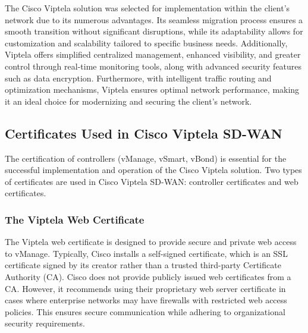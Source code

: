 \documentclass[12pt,english]{report}
\begin{document}
The Cisco Viptela solution was selected for implementation within the client’s network due to its numerous advantages. Its seamless migration process ensures a smooth transition without significant disruptions, while its adaptability allows for customization and scalability tailored to specific business needs. Additionally, Viptela offers simplified centralized management, enhanced visibility, and greater control through real-time monitoring tools, along with advanced security features such as data encryption. Furthermore, with intelligent traffic routing and optimization mechanisms, Viptela ensures optimal network performance, making it an ideal choice for modernizing and securing the client’s network.

\subsection{Certificates Used in Cisco Viptela SD-WAN}
The certification of controllers (vManage, vSmart, vBond) is essential for the successful implementation and operation of the Cisco Viptela solution. Two types of certificates are used in Cisco Viptela SD-WAN: controller certificates and web certificates\cite{ref16}.

\subsubsection{The Viptela Web Certificate}
The Viptela web certificate is designed to provide secure and private web access to vManage. Typically, Cisco installs a self-signed certificate, which is an SSL certificate signed by its creator rather than a trusted third-party Certificate Authority (CA). Cisco does not provide publicly issued web certificates from a CA. However, it recommends using their proprietary web server certificate in cases where enterprise networks may have firewalls with restricted web access policies. This ensures secure communication while adhering to organizational security requirements.
\end{document}
